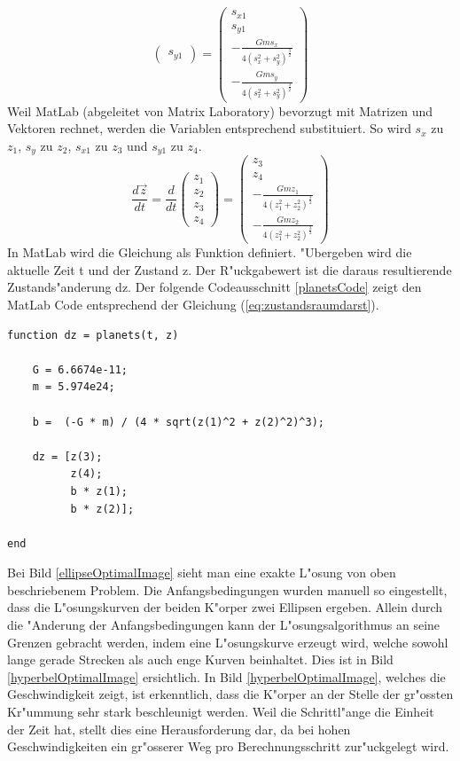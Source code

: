 \begin{refsection}
\begin{equation}
\begin{pmatrix}
s_{y1}
\end{pmatrix} = \begin{pmatrix}
s_{x1} \\ 
s_{y1}\\
-\frac{G m s_x}{4(s_x^2 + s_y^2)^\frac32} \\
-\frac{G m s_y}{4(s_x^2 + s_y^2)^\frac32}
\end{pmatrix}
\end{equation}
Weil MatLab (abgeleitet von Matrix Laboratory) bevorzugt mit Matrizen und Vektoren rechnet, werden die Variablen entsprechend substituiert.
So wird $s_x$ zu $z_1$, $s_y$ zu $z_2$, $s_{x1}$ zu $z_3$ und $s_{y1}$ zu $z_4$.
\begin{equation}\label{eq:zustandsraumdarst}
\frac{d \vec{z}}{dt}=\frac{d}{dt} \begin{pmatrix}
z_1 \\ 
z_2 \\
z_3 \\
z_4
\end{pmatrix} = \begin{pmatrix}
z_3 \\ 
z_4 \\
-\frac{G m z_1}{4(z_1^2 + z_2^2)^\frac32} \\
-\frac{G m z_2}{4(z_1^2 + z_2^2)^\frac32}
\end{pmatrix}
\end{equation}
In MatLab wird die Gleichung als Funktion definiert.
"Ubergeben wird die aktuelle Zeit t und der Zustand z.
Der R"uckgabewert ist die daraus resultierende  Zustands"anderung dz.
Der folgende Codeausschnitt \ref{planetsCode} zeigt den MatLab Code entsprechend der Gleichung (\ref{eq:zustandsraumdarst}).
\begin{lstlisting}[style=Matlab, caption={Problemfunktion}, captionpos=b, label={planetsCode}]
function dz = planets(t, z)

    G = 6.6674e-11;
    m = 5.974e24;

    b =  (-G * m) / (4 * sqrt(z(1)^2 + z(2)^2)^3);
    
    dz = [z(3);
          z(4);
          b * z(1);
          b * z(2)];
      
end
\end{lstlisting}

Bei Bild \ref{ellipseOptimalImage} sieht man eine exakte L"osung von oben beschriebenem Problem.
Die Anfangsbedingungen wurden manuell so eingestellt, dass die L"osungskurven der beiden K"orper zwei Ellipsen ergeben.
Allein durch die "Anderung der Anfangsbedingungen kann der L"osungsalgorithmus an seine Grenzen gebracht werden, indem eine L"osungskurve erzeugt wird, welche sowohl lange gerade Strecken als auch enge Kurven beinhaltet.
Dies ist in Bild \ref{hyperbelOptimalImage} ersichtlich.
In Bild \ref{hyperbelOptimalImage}, welches die Geschwindigkeit zeigt, ist erkenntlich, dass die K"orper an der Stelle der gr"ossten Kr"ummung sehr stark beschleunigt werden.
Weil die Schrittl"ange die Einheit der Zeit hat, stellt dies eine Herausforderung dar, da bei hohen Geschwindigkeiten ein gr"osserer Weg pro Berechnungsschritt zur"uckgelegt wird.


\end{refsection}
